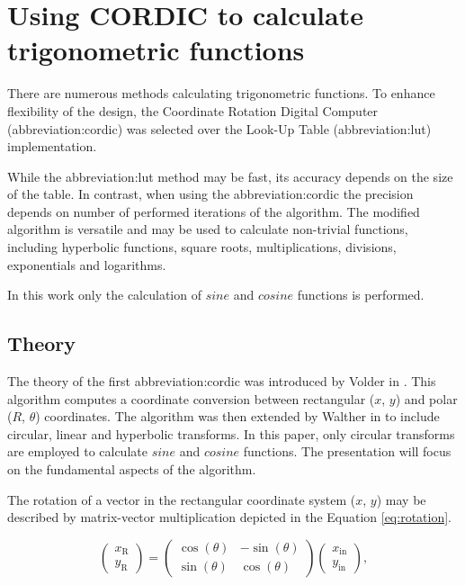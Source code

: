 \documentclass[a4paper, twoside, 11pt]{article}
\begin{document}
\section{Using CORDIC to calculate trigonometric functions}\label{sec:using-cordic-to-calculate-trigonometric-functions}
    There are numerous methods calculating trigonometric functions. To enhance flexibility of the design, the Coordinate Rotation Digital Computer (\gls{abbreviation:cordic}) was selected over the Look-Up Table (\gls{abbreviation:lut}) implementation.\par
    While the \gls{abbreviation:lut} method may be fast, its accuracy depends on the size of the table. In contrast, when using the \gls{abbreviation:cordic} the precision depends on number of performed iterations of the algorithm. The modified algorithm is versatile and may be used to calculate non-trivial functions, including hyperbolic functions, square roots, multiplications, divisions, exponentials and logarithms. \cite{base-digital-signal-processing-with-field-programmable-gate-arrays}\par
    In this work only the calculation of $sine$ and $cosine$ functions is performed.

    \subsection{Theory}\label{subsec:cordic-theory}
        The theory of the first \gls{abbreviation:cordic} was introduced by Volder in \cite{volder-cordic-trigonomtric-computing-technique}. This algorithm computes a coordinate conversion between rectangular ($x$, $y$) and polar ($R$, $\theta$) coordinates. The algorithm was then extended by Walther in \cite{walther-a-unified-algorithm-for-elementary-functions} to include circular, linear and hyperbolic transforms.  In this paper, only circular transforms are employed to calculate  $sine$ and $cosine$ functions. The presentation will focus on the fundamental aspects of the algorithm.\par
        The rotation of a vector in the rectangular coordinate system ($x$, $y$) may be described by matrix-vector multiplication depicted in the Equation \ref{eq:rotation}.

        \begin{equation}\label{eq:rotation}
             \begin{pmatrix}
                 x_\text{R}\\
                 y_\text{R}
             \end{pmatrix}
             =
             \begin{pmatrix}
                 \cos (\theta) & -\sin (\theta)\\
                 \sin (\theta) & \cos (\theta)
             \end{pmatrix}
             \begin{pmatrix}
                 x_\text{in}\\
                 y_\text{in}
             \end{pmatrix},
        \end{equation}
\end{document}
